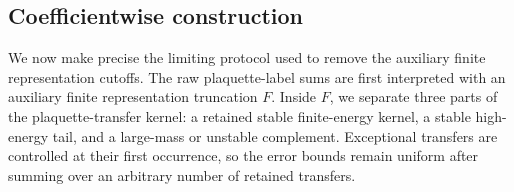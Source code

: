 \documentclass[11pt,a4paper,reqno]{amsart}
\theoremstyle{definition}
\theoremstyle{remark}
\begin{document}
\subsection{Coefficientwise construction}\label{subsec:coefficientwise-construction}


We now make precise the limiting protocol used to remove the auxiliary finite representation cutoffs.  The raw plaquette-label sums are first interpreted with an auxiliary finite representation truncation $F$.  Inside $F$, we separate three parts of the plaquette-transfer kernel: a retained stable finite-energy kernel, a stable high-energy tail, and a large-mass or unstable complement.  Exceptional transfers are controlled at their first occurrence, so the error bounds remain uniform after summing over an arbitrary number of retained transfers.
\end{document}

